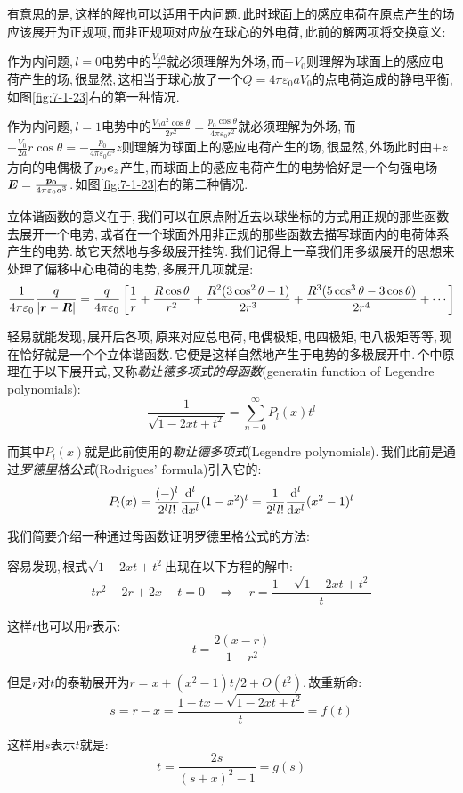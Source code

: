 有意思的是,\,这样的解也可以适用于内问题.\,此时球面上的感应电荷在原点产生的场应该展开为正规项,\,而非正规项对应放在球心的外电荷,\,此前的解两项将交换意义:

作为内问题,\,$l=0$电势中的$\frac{V_0 a}{r}$就必须理解为外场,\,而$-V_0$则理解为球面上的感应电荷产生的场,\,很显然,\,这相当于球心放了一个$Q=4\pi\varepsilon_0 aV_0$的点电荷造成的静电平衡,\,如图\ref{fig:7-1-23}右的第一种情况.

作为内问题,\,$l=1$电势中的$\frac{V_0 a^2\cos\theta}{2r^2}=\frac{p_0\cos\theta}{4\pi\varepsilon_0r^2}$就必须理解为外场,\,而$-\frac{V_0}{2a}r\cos\theta=-\frac{p_0}{4\pi\varepsilon_0 a^3} z$则理解为球面上的感应电荷产生的场,\,很显然,\,外场此时由$+z$方向的电偶极子$p_0\boldsymbol{e}_z$产生,\,而球面上的感应电荷产生的电势恰好是一个匀强电场$\boldsymbol{E}=\frac{\boldsymbol{p_0}}{4\pi\varepsilon_0 a^3}$.\,如图\ref{fig:7-1-23}右的第二种情况.

立体谐函数的意义在于,\,我们可以在原点附近去以球坐标的方式用正规的那些函数去展开一个电势,\,或者在一个球面外用非正规的那些函数去描写球面内的电荷体系产生的电势.\,故它天然地与多级展开挂钩.\,我们记得上一章我们用多级展开的思想来处理了偏移中心电荷的电势,\,多展开几项就是:
\[\frac{1}{4\pi\varepsilon_0} \frac{q}{|\boldsymbol{r}-\boldsymbol{R}|}=\frac{q}{4\pi\varepsilon_0} \left[\frac{1}{r}+\frac{R\cos\theta}{r^2}+\frac{R^2(3\cos^2\theta-1)}{2r^3}+\frac{R^3(5\cos^3\theta-3\cos\theta)}{2r^4}+\cdots\right]\]

轻易就能发现,\,展开后各项,\,原来对应总电荷,\,电偶极矩,\,电四极矩,\,电八极矩等等,\,现在恰好就是一个个立体谐函数.\,它便是这样自然地产生于电势的多极展开中.\,个中原理在于以下展开式,\,又称\emph{勒让德多项式的母函数}(generatin function of Legendre polynomials):
\[\frac{1}{\sqrt{1-2xt+t^2}}=\sum_{n=0}^\infty P_l(x)t^l\]

而其中$P_l(x)$就是此前使用的\emph{勒让德多项式}(Legendre polynomials).\,我们此前是通过\emph{罗德里格公式}(Rodrigues' formula)引入它的:
\[P_l(x)=\frac{(-)^l}{2^ll!}\frac{\textrm{d}^l}{\textrm{d} x^l}(1-x^2)^l=\frac{1}{2^ll!}\frac{\textrm{d}^l}{\textrm{d} x^l}(x^2-1)^l\]

我们简要介绍一种通过母函数证明罗德里格公式的方法:

容易发现,\,根式$\sqrt{1-2xt+t^2}$出现在以下方程的解中:
\[tr^2-2r+2x-t=0\quad\Rightarrow\quad  r=\frac{1-\sqrt{1-2xt+t^2}}{t}\]

这样$t$也可以用$r$表示:
\[t=\frac{2(x-r)}{1-r^2}\]

但是$r$对$t$的泰勒展开为$r=x+(x^2-1)t/2+O(t^2)$.\,故重新命:
\[s=r-x=\frac{1-tx-\sqrt{1-2xt+t^2}}{t}=f(t)\]

这样用$s$表示$t$就是:
\[t=\frac{2s}{(s+x)^2-1}=g(s)\]

